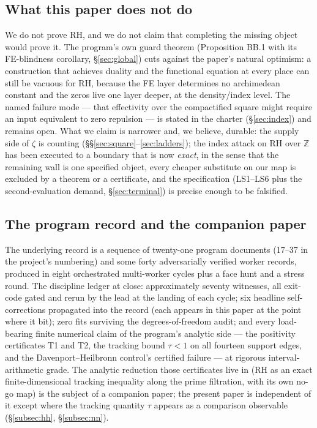 \documentclass[11pt,reqno]{amsart}
\theoremstyle{plain}
\theoremstyle{definition}
\theoremstyle{remark}
\newcommand{\Z}{\mathbb{Z}}
\begin{document}
\subsection{What this paper does not do}

We do not prove RH, and we do not claim that completing the missing object would prove it.
The program's own guard theorem (Proposition BB.1 with its FE-blindness corollary,
\S\ref{sec:global}) cuts against the paper's natural optimism: a construction that achieves
duality and the functional equation at every place can still be vacuous for RH, because the
FE layer determines no archimedean constant and the zeros live one layer deeper, at the
density/index level. The named failure mode --- that effectivity over the compactified square
might require an input equivalent to zero repulsion --- is stated in the charter
(\S\ref{sec:index}) and remains open. What we claim is narrower and, we believe, durable:
the supply side of $\zeta$ is counting (\S\S\ref{sec:square}--\ref{sec:ladders}); the index
attack on RH over $\Z$ has been executed to a boundary that is now \emph{exact}, in the sense
that the remaining wall is one specified object, every cheaper substitute on our map is
excluded by a theorem or a certificate, and the specification (LS1--LS6 plus the
second-evaluation demand, \S\ref{sec:terminal}) is precise enough to be falsified.

\subsection{The program record and the companion paper}

The underlying record is a sequence of twenty-one program documents (17--37 in the project's
numbering) and some forty adversarially verified worker records, produced in eight
orchestrated multi-worker cycles plus a face hunt and a stress round. The discipline ledger
at close: approximately seventy witnesses, all exit-code gated and rerun by the lead at the
landing of each cycle; six headline self-corrections propagated into the record (each
appears in this paper at the point where it bit); zero fits surviving the
degrees-of-freedom audit; and every load-bearing finite numerical claim of the program's
analytic side --- the positivity certificates T1 and T2, the tracking bound $\tau < 1$ on
all fourteen support edges, and the Davenport--Heilbronn control's certified failure ---
at rigorous interval-arithmetic grade. The analytic reduction those certificates live in
(RH as an exact finite-dimensional tracking inequality along the prime filtration, with its
own no-go map) is the subject of a companion paper; the present paper is independent of it
except where the tracking quantity $\tau$ appears as a comparison observable
(\S\ref{subsec:hh}, \S\ref{subsec:nn}).
\end{document}
